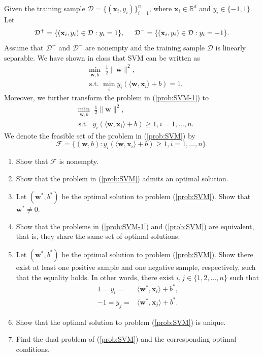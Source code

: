 \documentclass[11pt,letter,notitlepage]{article}
\begin{document}
\begin{exercise}
	Given the training sample $\mathcal{D}=\{ (\textbf{x}_i,y_i) \}_{i=1}^n$, where $\textbf{x}_i \in \mathbb{R}^d$ and $y_i \in \{ -1,1 \}$. Let
	\begin{align*}
		\mathcal{D}^+=\{(\textbf{x}_i,y_i)\in\mathcal{D}:y_i=1\},\hspace{5mm}\mathcal{D}^-=\{(\textbf{x}_i,y_i)\in\mathcal{D}:y_i=-1\}.
	\end{align*}
	Assume that $\mathcal{D}^+$ and $\mathcal{D}^-$ are nonempty and the training sample $\mathcal{D}$ is linearly separable. We have shown in class that SVM can be written as
	\begin{align}\label{prob:SVM-1}
		 & \min_{\textbf{w},b}\,\,\frac{1}{2}\| \textbf{w} \|^2,                                      \\
		 & \text{ s.t. } \min_i y_{i} ( \langle \textbf{w}, \textbf{x}_i \rangle + b ) = 1. \nonumber
	\end{align}
	Moreover, we further transform the problem in (\ref{prob:SVM-1}) to
	\begin{align}\label{prob:SVM}
		 & \min_{\textbf{w},b}\,\,\frac{1}{2}\| \textbf{w} \|^2,                                                    \\
		 & \text{ s.t. }\,\, y_{i} ( \langle \textbf{w}, \textbf{x}_i \rangle + b ) \geq 1, i=1,\ldots,n. \nonumber
	\end{align}
	We denote the feasible set of the problem in (\ref{prob:SVM}) by $$\mathcal{F}=\{(\mathbf{w},b):y_{i} ( \langle \textbf{w}, \textbf{x}_i \rangle + b ) \geq 1, i=1,\ldots,n\}.$$

	\begin{enumerate}
		\item Show that $\mathcal{F}$ is nonempty.
		\item Show that the problem in (\ref{prob:SVM}) admits an optimal solution.
		\item Let $(\textbf{w}^*,b^*)$ be the optimal solution to problem (\ref{prob:SVM}). Show that $\mathbf{w}^*\neq0$.
		\item Show that the problems in (\ref{prob:SVM-1}) and (\ref{prob:SVM}) are equivalent, that is, they share the same set of optimal solutions.
		\item Let $(\textbf{w}^*,b^*)$ be the optimal solution to problem (\ref{prob:SVM}). Show there exist at least one positive sample and one negative sample, respectively, such that the equality holds. In other words, there exist $i,j \in \{ 1,2,\dots,n \}$ such that
		      \begin{align*}
			      1=y_i =  & \langle \textbf{w}^*, \textbf{x}_i \rangle + b^*, \\
			      -1=y_j = & \langle \textbf{w}^*, \textbf{x}_j \rangle + b^*.
		      \end{align*}
		\item Show that the optimal solution to problem (\ref{prob:SVM}) is unique.
		\item Find the dual problem of (\ref{prob:SVM}) and the corresponding optimal conditions.
	\end{enumerate}

\end{exercise}
\end{document}
